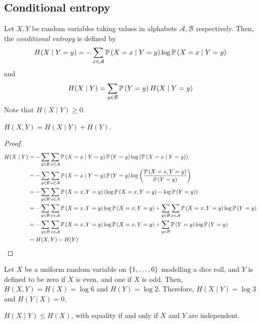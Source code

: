 \subsection{Conditional entropy}
\begin{definition}
    Let \( X, Y \) be random variables taking values in alphabets \( \mathcal A, \mathcal B \) respectively.
    Then, the \emph{conditional entropy} is defined by
    \[ H(X \mid Y = y) = - \sum_{x \in \mathcal A} \mathbb{P}\left({X = x \mid Y = y}\right) \log \mathbb{P}\left({X = x \mid Y = y}\right) \]
    and
    \[ H(X \mid Y) = \sum_{y \in \mathcal B} \mathbb{P}\left({Y = y}\right) H(X \mid Y = y) \]
    Note that \( H(X \mid Y) \geq 0 \).
\end{definition}
\begin{lemma}
    \( H(X,Y) = H(X \mid Y) + H(Y) \).
\end{lemma}
\begin{proof}
    \begin{align*}
        H(X \mid Y) &= -\sum_{y \in \mathcal B} \sum_{x \in \mathcal A} \mathbb{P}\left({X = x \mid Y = y}\right) \mathbb{P}\left({Y = y}\right) \log \qty(\mathbb{P}\left({X = x \mid Y = y}\right)) \\
        &= -\sum_{y \in \mathcal B} \sum_{x \in \mathcal A} \mathbb{P}\left({X = x \mid Y = y}\right) \mathbb{P}\left({Y = y}\right) \log \qty(\frac{\mathbb{P}\left({X = x, Y = y}\right)}{\mathbb{P}\left({Y = y}\right)}) \\
        &= -\sum_{y \in \mathcal B} \sum_{x \in \mathcal A} \mathbb{P}\left({X = x, Y = y}\right) \qty(\log \mathbb{P}\left({X = x, Y = y}\right) - \log \mathbb{P}\left({Y = y}\right)) \\
        &= -\sum_{y \in \mathcal B} \sum_{x \in \mathcal A} \mathbb{P}\left({X = x, Y = y}\right) \log \mathbb{P}\left({X = x, Y = y}\right) + \sum_{y \in \mathcal B} \sum_{x \in \mathcal A} \mathbb{P}\left({X = x, Y = y}\right) \log \mathbb{P}\left({Y = y}\right) \\
        &= -\sum_{y \in \mathcal B} \sum_{x \in \mathcal A} \mathbb{P}\left({X = x, Y = y}\right) \log \mathbb{P}\left({X = x, Y = y}\right) + \sum_{y \in \mathcal B} \mathbb{P}\left({Y = y}\right) \log \mathbb{P}\left({Y = y}\right) \\
        &= H(X,Y) - H(Y)
    \end{align*}
\end{proof}
\begin{example}
    Let \( X \) be a uniform random variable on \( \qty{1, \dots, 6} \) modelling a dice roll, and \( Y \) is defined to be zero if \( X \) is even, and one if \( X \) is odd.
    Then, \( H(X,Y) = H(X) = \log 6 \) and \( H(Y) = \log 2 \).
    Therefore, \( H(X \mid Y) = \log 3 \) and \( H(Y \mid X) = 0 \).
\end{example}
\begin{corollary}
    \( H(X\mid Y) \leq H(X) \), with equality if and only if \( X \) and \( Y \) are independent.
\end{corollary}
